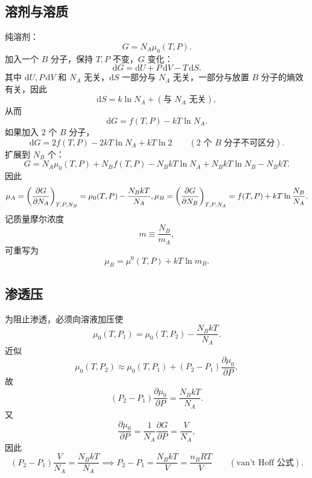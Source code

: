 \subsection{溶剂与溶质}
纯溶剂：
\begin{equation}
    G=N_A\mu_0(T,P).
\end{equation}
加入一个 $B$ 分子，保持 $T,P$ 不变，$G$ 变化：
\begin{equation}
    \mathrm{d}G=\mathrm{d}U+P\,\mathrm{d}V-T\,\mathrm{d}S.
\end{equation}
其中 $\mathrm{d}U,P\,\mathrm{d}V$ 和 $N_A$ 无关，$\mathrm{d}S$ 一部分与 $N_A$ 无关，一部分与放置 $B$ 分子的熵效有关，因此
\begin{equation}
    \mathrm{d}S=k\ln N_A+(\text{与 }N_A\text{ 无关}),
\end{equation}
从而
\begin{equation}
    \mathrm{d}G=f(T,P)-kT\ln N_A.
\end{equation}
如果加入 $2$ 个 $B$ 分子，
\begin{equation}
    \mathrm{d}G=2f(T,P)-2kT\ln N_A+kT\ln 2\qquad (2\text{ 个 }B\text{ 分子不可区分}).
\end{equation}
扩展到 $N_B$ 个：
\begin{equation}
    G=N_A\mu_0(T,P)+N_Bf(T,P)-N_BkT\ln N_A+N_BkT\ln N_B-N_BkT.
\end{equation}
因此
\begin{equation}
    \mu_A=\left(\frac{\partial G}{\partial N_A}\right)_{T,P,N_B}=\mu_0(T,P)-\frac{N_BkT}{N_A},\\
    \mu_B=\left(\frac{\partial G}{\partial N_B}\right)_{T,P,N_A}=f(T,P)+kT\ln\frac{N_B}{N_A}.
\end{equation}
记质量摩尔浓度
\begin{equation}
    m\equiv \frac{N_B}{m_A},
\end{equation}
可重写为
\begin{equation}
    \mu_B=\mu^0(T,P)+kT\ln m_B.
\end{equation}

\subsection{渗透压}
为阻止渗透，必须向溶液加压使
\begin{equation}
    \mu_0(T,P_1)=\mu_0(T,P_2)-\frac{N_BkT}{N_A}.
\end{equation}
近似
\begin{equation}
    \mu_0(T,P_2)\approx \mu_0(T,P_1)+(P_2-P_1)\frac{\partial \mu_0}{\partial P},
\end{equation}
故
\begin{equation}
    (P_2-P_1)\frac{\partial \mu_0}{\partial P}=\frac{N_BkT}{N_A}.
\end{equation}
又
\begin{equation}
    \frac{\partial \mu_0}{\partial P}=\frac{1}{N_A}\frac{\partial G}{\partial P}=\frac{V}{N_A},
\end{equation}
因此
\begin{equation}
    (P_2-P_1)\frac{V}{N_A}=\frac{N_BkT}{N_A}
    \implies P_2-P_1=\frac{N_BkT}{V}=\frac{n_BRT}{V}\qquad (\text{van't Hoff 公式}).
\end{equation}


